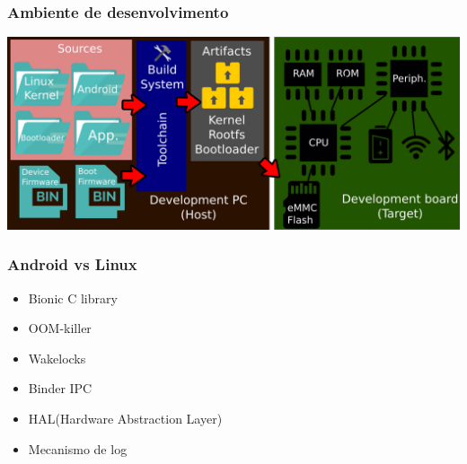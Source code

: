 \documentclass{beamer}
\begin{document}
\begin{frame}
  \frametitle{Ambiente de desenvolvimento}
  \includegraphics[width=\textwidth,height=\textheight,keepaspectratio]{./media/embedded_env.png}
\end{frame}

\begin{frame}
  \frametitle{Android vs Linux}
  \begin{itemize}
  \item Bionic C library
  \item OOM-killer
  \item Wakelocks
  \item Binder IPC
  \item HAL(Hardware Abstraction Layer)
  \item Mecanismo de log
  \end{itemize}
\end{frame}
\end{document}
